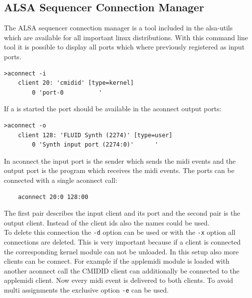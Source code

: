 \documentclass[paper=a4,fontsize=11pt,twocolumn,pagesize,bibtotoc]{scrartcl}
\begin{document}
\subsection{ALSA Sequencer Connection Manager}
\label{aconnect}
The ALSA sequencer connection manager is a tool included in the alsa-utils which are available for all important linux distributions. With this command line tool it is possible to display all ports which where previously registered as input ports.
\begin{lstlisting}
>aconnect -i
	client 20: 'cmidid' [type=kernel]
		0 'port-0          '
\end{lstlisting}
If a  is started the port should be available in the aconnect output ports:
\begin{lstlisting}
>aconnect -o
	client 128: 'FLUID Synth (2274)' [type=user]
		0 'Synth input port (2274:0)'      '
\end{lstlisting}
In aconnect the input port is the sender which sends the midi events and the output port is the program which receives the midi events. The ports can be connected with a single aconnect call:
\begin{lstlisting}
	aconnect 20:0 128:00
\end{lstlisting}
The first pair describes the input client and its port and the second pair is the output client. Instead of the client ids also the names could be used.\\
To delete this connection the \texttt{-d} option can be used or with the \texttt{-x} option all connections are deleted. This is very important because if a client is connected the corresponding kernel module can not be unloaded. In this setup also more clients can be connect. For example if the applemidi module is loaded with another aconnect call the CMIDID client can additionally be connected to the applemidi client. Now every midi event is delivered to both clients. To avoid multi assignments the exclusive option \texttt{-e} can be used.
\end{document}
